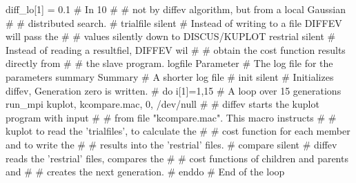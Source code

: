 \begin{MacVerbatim}
diff_lo[1]  = 0.1       # In 10%
#                       # not by diffev algorithm, but from a local Gaussian
#                       # distributed search.
#
trialfile  silent       # Instead of writing to a file DIFFEV will pass the
#                       # values silently down to DISCUS/KUPLOT
restrial   silent       # Instead of reading a resultfiel, DIFFEV wil
#                       # obtain the cost function results directly from
#                       # the slave program.
logfile    Parameter    # The log file for the parameters
summary    Summary      # A shorter log file
#
init       silent       # Initializes diffev, Generation zero is written.
#
do i[1]=1,15            # A loop over 15 generations
  run_mpi kuplot, kcompare.mac, 0,  /dev/null
#                       # diffev starts the kuplot program with input
#                       # from file "kcompare.mac". This macro instructs
#                       # kuplot to read the 'trialfiles', to calculate the
#                       # cost function for each member and to write the
#                       # results into the 'restrial' files.
#
  compare  silent       # diffev reads the 'restrial' files, compares the
#                       # cost functions of children and parents and
#                       # creates the next generation.
#
enddo                   # End of the loop
\end{MacVerbatim}
